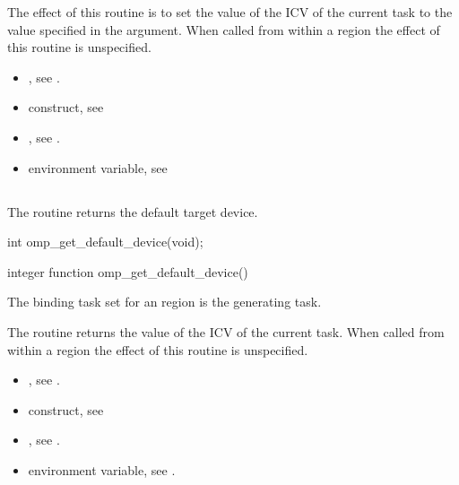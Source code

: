 \effect
The effect of this routine is to set the value of the 
 ICV of the current task to the value 
specified in the argument. When called from within a  
region the effect of this routine is unspecified.

\crossreferences
\begin{itemize}
\item {}, see
.

\item {} construct, see

\item {}, see
.

\item {} environment variable, see
\end{itemize}



\subsection{}
\label{subsec:omp_get_default_device}
\summary
The  routine returns the default target device.

\format
\begin{ccppspecific}
\begin{ompcFunction}
int omp_get_default_device(void);
\end{ompcFunction}
\end{ccppspecific}

\begin{fortranspecific}
\begin{ompfFunction}
integer function omp_get_default_device()
\end{ompfFunction}
\end{fortranspecific}

\binding
The binding task set for an  region 
is the generating task.

\effect
The  routine returns the value of the 
 ICV of the current task. When called from 
within a  region the effect of this routine is unspecified.

\crossreferences
\begin{itemize}
\item {}, see
.

\item {} construct, see

\item {}, see
.

\item {} environment variable, see
.
\end{itemize}



